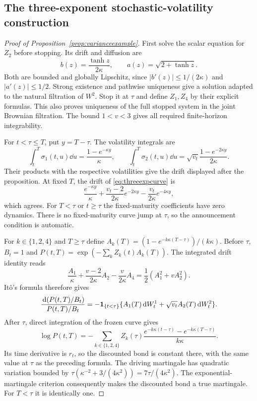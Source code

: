 \subsection{The three-exponent stochastic-volatility construction}\label{app:varianceexample}
\begin{proof}[Proof of Proposition~\ref{prop:varianceexample}]
First solve the scalar equation for $Z_2$ before stopping. Its drift and diffusion are
\[
b(z)=\frac{\tanh z}{2\kappa},\qquad a(z)=\sqrt{2+\tanh z}.
\]
Both are bounded and globally Lipschitz, since
$|b'(z)|\le1/(2\kappa)$ and $|a'(z)|\le1/2$.
Strong existence and pathwise uniqueness give a solution adapted to the natural filtration of $W^2$. Stop it at $\tau$ and define $Z_1,Z_4$ by their explicit formulas. This also proves uniqueness of the full stopped system in the joint Brownian filtration. The bound $1<v<3$ gives all required finite-horizon integrability.

For $t<\tau\le T$, put $y=T-\tau$. The volatility integrals are
\[
\int_t^T\sigma_1(t,u)\dd u=\frac{1-e^{-\kappa y}}{\kappa},\qquad
\int_t^T\sigma_2(t,u)\dd u=\sqrt{v_t}\frac{1-e^{-2\kappa y}}{2\kappa}.
\]
Their products with the respective volatilities give the drift displayed after the proposition. At fixed $T$, the drift of \eqref{eq:threeexpcurve} is
\[
\frac{e^{-\kappa y}}{\kappa}
 +\frac{v_t-2}{2\kappa}e^{-2\kappa y}
 -\frac{v_t}{2\kappa}e^{-4\kappa y},
\]
which agrees. For $T<\tau$ or $t\ge\tau$ the fixed-maturity coefficients have zero dynamics. There is no fixed-maturity curve jump at $\tau$, so the announcement condition is automatic.

For $k\in\{1,2,4\}$ and $T\ge\tau$ define
$A_k(T)=(1-e^{-k\kappa(T-\tau)})/(k\kappa)$.
Before $\tau$, $B_t=1$ and $P(t,T)=\exp(-\sum_k Z_k(t)A_k(T))$.
The integrated drift identity reads
\[
\frac{A_1}{\kappa}+\frac{v-2}{2\kappa}A_2-\frac{v}{2\kappa}A_4
       =\frac12(A_1^2+vA_2^2).
\]
It\^o's formula therefore gives
\[
\frac{\,\mathrm d(P(t,T)/B_t)}{P(t,T)/B_t}
 =-\mathbf 1_{\{t<\tau\}}\{A_1(T)\,\mathrm d W^1_t+\sqrt{v_t}A_2(T)\,\mathrm d W^2_t\}.
\]
After $\tau$, direct integration of the frozen curve gives
\[
\log P(t,T)=-\sum_{k\in\{1,2,4\}}Z_k(\tau)
  \frac{e^{-k\kappa(t-\tau)}-e^{-k\kappa(T-\tau)}}{k\kappa}.
\]
Its time derivative is $r_t$, so the discounted bond is constant there, with the same value at $\tau$ as the preceding formula. The driving martingale has quadratic variation bounded by
$\tau(\kappa^{-2}+3/(4\kappa^2))=7\tau/(4\kappa^2)$.
The exponential-martingale criterion consequently makes the discounted bond a true martingale. For $T<\tau$ it is identically one.


\end{proof}
